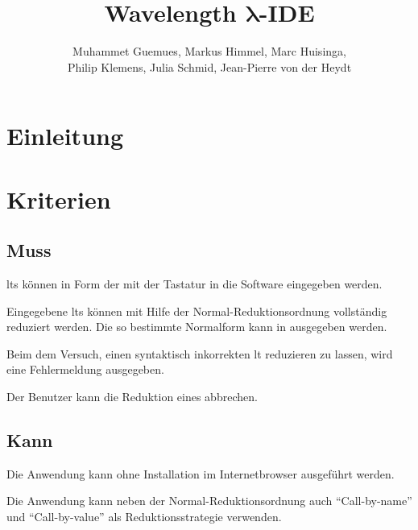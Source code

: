 \documentclass[parskip=full,11pt,twoside]{scrartcl}
\title{Wavelength $\bm{\lambda}$-IDE}
\author{Muhammet Guemues, Markus Himmel, Marc Huisinga,\\Philip Klemens, Julia Schmid, Jean-Pierre von der Heydt}
\begin{document}
\maketitle

\section{Einleitung}


\pagebreak
\section{Kriterien}

\subsection{Muss}

\glspl{lt} können in Form der 
mit der Tastatur in die Software eingegeben werden.

Eingegebene \glspl{lt} können mit Hilfe der Normal-Reduktionsordnung vollständig
reduziert werden. Die so bestimmte Normalform kann in 
ausgegeben werden.

Beim dem Versuch, einen syntaktisch inkorrekten \gls{lt} reduzieren zu lassen, wird eine
Fehlermeldung ausgegeben.

Der Benutzer kann die Reduktion eines  abbrechen.


\subsection{Kann}

Die Anwendung kann ohne Installation im Internetbrowser ausgeführt werden.

Die Anwendung kann neben der Normal-Reduktionsordnung auch \enquote{Call-by-name}
und \enquote{Call-by-value} als Reduktionsstrategie verwenden.
\end{document}
